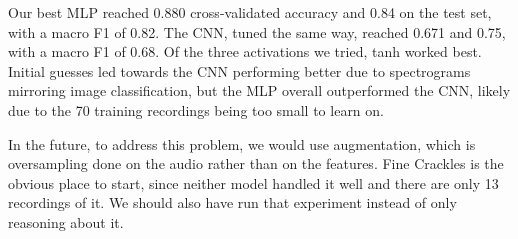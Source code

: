 \documentclass[conference]{IEEEtran}
\begin{document}
Our best MLP reached 0.880 cross-validated accuracy and 0.84 on the test set,
with a macro F1 of 0.82. The CNN, tuned the same way, reached 0.671 and 0.75,
with a macro F1 of 0.68. Of the three activations we tried, tanh worked best.
Initial guesses led towards the CNN performing better due to spectrograms
mirroring image classification, but the MLP overall outperformed the CNN, likely
due to the 70 training recordings being too small to learn on.

In the future, to address this problem, we would use augmentation, which is
oversampling done on the audio rather than on the features. Fine Crackles is the
obvious place to start, since neither model handled it well and there are only 13
recordings of it. We should also have run that experiment instead of only
reasoning about it.












 
\end{document}

